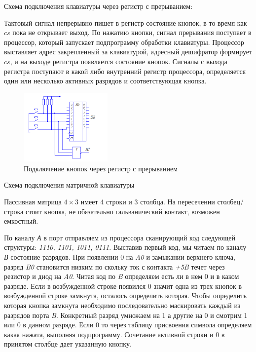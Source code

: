 \documentclass[unicode, 12pt, a4paper, oneside]{article}
\begin{document}
Схема подключения клавиатуры через регистр с прерыванием:

Тактовый сигнал непрерывно пишет в регистр состояние кнопок, в то время как $cs$ пока не открывает выход. По нажатию кнопки, сигнал прерывания поступает в процессор, который запускает подпрограмму обработки клавиатуры. Процессор выставляет адрес закрепленный за клавиатурой, адресный дешифратор формирует $cs$, и на выходе регистра появляется состояние кнопок. Сигналы с выхода регистра поступают в какой либо внутренний регистр процессора, определяется один или несколько активных разрядов и соответствующая кнопка. 

\begin{figure}[H]
\centering
\includegraphics[width=0.4\textwidth]{106_Button.png}
\caption{Подключение кнопок через регистр с прерыванием}
\end{figure}

Схема подключения матричной клавиатуры

Пассивная матрица $4\times 3$ имеет 4 строки и 3 столбца. На пересечении столбец/строка стоит кнопка, не обязательно гальванический контакт, возможен емкостный.

По каналу {\it А} в порт отправляем из процессора сканирующий код следующей структуры: {\it 1110, 1101, 1011, 0111}. Выставив первый код, мы читаем по каналу {\it В} состояние разрядов. При появлении 0 на {\it A0} и замыкании верхнего ключа, разряд {\it B0} становится низким по скольку ток с контакта {\it +5B} течет через резистор и диод на {\it A0}. Читая код по {\it B} определяем есть ли в нем 0 и в каком разряде. Если в возбужденной строке появился 0 значит одна из трех кнопок в возбужденной строке замкнута, осталось определить которая. Чтобы определить которая кнопка замкнута необходимо последовательно маскировать каждый из разрядов порта {\it B}. Конкретный разряд умножаем на 1 а другие на 0 и смотрим 1 или 0 в данном разряде. Если 0 то через таблицу присвоения символа определяем какая нажата, выполняя подпрограмму. Сочетание активной строки и 0 в принятом столбце дает указанную кнопку.
\end{document}
